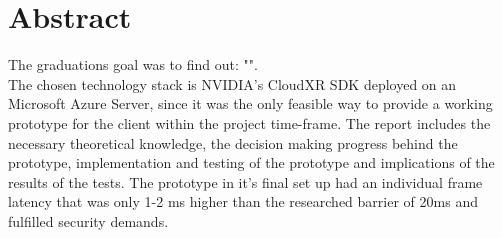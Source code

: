 
\section{Abstract}

The graduations goal was to find out: "\textit{}". \\

The chosen technology stack is NVIDIA's CloudXR SDK deployed on an Microsoft Azure Server, since it was the only feasible way to provide a working prototype for the client within the project time-frame. The report includes the necessary theoretical knowledge, the decision making progress behind the prototype, implementation and testing of the prototype and implications of the results of the tests. The prototype in it's final set up had an individual frame latency that was only 1-2 \acrshort{ms} higher than the researched barrier of 20\acrshort{ms} and fulfilled security demands.


